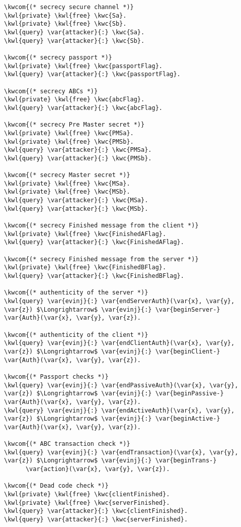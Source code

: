 \begin{Verbatim}[commandchars=\\\{\},codes={\catcode`$=3}]
\kwcom{(* secrecy secure channel *)}
\kwl{private} \kwl{free} \kwc{Sa}.
\kwl{private} \kwl{free} \kwc{Sb}.
\kwl{query} \var{attacker}{:} \kwc{Sa}.
\kwl{query} \var{attacker}{:} \kwc{Sb}.

\kwcom{(* secrecy passport *)}
\kwl{private} \kwl{free} \kwc{passportFlag}.
\kwl{query} \var{attacker}{:} \kwc{passportFlag}.

\kwcom{(* secrecy ABCs *)}
\kwl{private} \kwl{free} \kwc{abcFlag}.
\kwl{query} \var{attacker}{:} \kwc{abcFlag}.

\kwcom{(* secrecy Pre Master secret *)}
\kwl{private} \kwl{free} \kwc{PMSa}.
\kwl{private} \kwl{free} \kwc{PMSb}.
\kwl{query} \var{attacker}{:} \kwc{PMSa}.
\kwl{query} \var{attacker}{:} \kwc{PMSb}.

\kwcom{(* secrecy Master secret *)}
\kwl{private} \kwl{free} \kwc{MSa}.
\kwl{private} \kwl{free} \kwc{MSb}.
\kwl{query} \var{attacker}{:} \kwc{MSa}.
\kwl{query} \var{attacker}{:} \kwc{MSb}.

\kwcom{(* secrecy Finished message from the client *)}
\kwl{private} \kwl{free} \kwc{FinishedAFlag}.
\kwl{query} \var{attacker}{:} \kwc{FinishedAFlag}.

\kwcom{(* secrecy Finished message from the server *)}
\kwl{private} \kwl{free} \kwc{FinishedBFlag}.
\kwl{query} \var{attacker}{:} \kwc{FinishedBFlag}.

\kwcom{(* authenticity of the server *)}
\kwl{query} \var{evinj}{:} \var{endServerAuth}(\var{x}, \var{y}, \var{z}) $\Longrightarrow$ \var{evinj}{:} \var{beginServer-}
\var{Auth}(\var{x}, \var{y}, \var{z}).

\kwcom{(* authenticity of the client *)}
\kwl{query} \var{evinj}{:} \var{endClientAuth}(\var{x}, \var{y}, \var{z}) $\Longrightarrow$ \var{evinj}{:} \var{beginClient-}
\var{Auth}(\var{x}, \var{y}, \var{z}).

\kwcom{(* Passport checks *)}
\kwl{query} \var{evinj}{:} \var{endPassiveAuth}(\var{x}, \var{y}, \var{z}) $\Longrightarrow$ \var{evinj}{:} \var{beginPassive-}
\var{Auth}(\var{x}, \var{y}, \var{z}).
\kwl{query} \var{evinj}{:} \var{endActiveAuth}(\var{x}, \var{y}, \var{z}) $\Longrightarrow$ \var{evinj}{:} \var{beginActive-}
\var{Auth}(\var{x}, \var{y}, \var{z}).

\kwcom{(* ABC transaction check *)}
\kwl{query} \var{evinj}{:} \var{endTransaction}(\var{x}, \var{y}, \var{z}) $\Longrightarrow$ \var{evinj}{:} \var{beginTrans-}
      \var{action}(\var{x}, \var{y}, \var{z}).

\kwcom{(* Dead code check *)}
\kwl{private} \kwl{free} \kwc{clientFinished}.
\kwl{private} \kwl{free} \kwc{serverFinished}.
\kwl{query} \var{attacker}{:} \kwc{clientFinished}.
\kwl{query} \var{attacker}{:} \kwc{serverFinished}.
\end{Verbatim}

